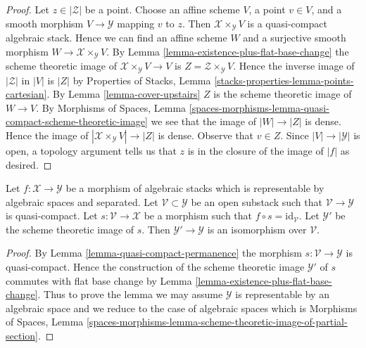 \begin{proof}
Let $z \in |\mathcal{Z}|$ be a point.
Choose an affine scheme $V$, a point $v \in V$, and a smooth morphism
$V \to \mathcal{Y}$ mapping $v$ to $z$.
Then $\mathcal{X} \times_\mathcal{Y} V$ is a quasi-compact algebraic stack.
Hence we can find an affine scheme $W$ and a surjective smooth
morphism $W \to \mathcal{X} \times_\mathcal{Y} V$.
By Lemma \ref{lemma-existence-plus-flat-base-change}
the scheme theoretic image of
$\mathcal{X} \times_\mathcal{Y} V \to V$ is
$Z = \mathcal{Z} \times_\mathcal{Y} V$.
Hence the inverse image of $|\mathcal{Z}|$ in $|V|$ is $|Z|$ by
Properties of Stacks, Lemma \ref{stacks-properties-lemma-points-cartesian}.
By Lemma \ref{lemma-cover-upstairs} $Z$ is
the scheme theoretic image of $W \to V$.
By Morphisms of Spaces, Lemma
\ref{spaces-morphisms-lemma-quasi-compact-scheme-theoretic-image}
we see that the image of $|W| \to |Z|$ is dense.
Hence the image of $|\mathcal{X} \times_\mathcal{Y} V| \to |Z|$
is dense. Observe that $v \in Z$.
Since $|V| \to |\mathcal{Y}|$ is open, a topology argument
tells us that $z$ is in the closure of the image of $|f|$ as desired.
\end{proof}

\begin{lemma}
\label{lemma-scheme-theoretic-image-of-partial-section}
Let $f : \mathcal{X} \to \mathcal{Y}$ be a morphism of algebraic stacks
which is representable by algebraic spaces and separated.
Let $\mathcal{V} \subset \mathcal{Y}$ be an open substack such that
$\mathcal{V} \to \mathcal{Y}$ is quasi-compact.
Let $s : \mathcal{V} \to \mathcal{X}$ be a morphism such that
$f \circ s = \text{id}_\mathcal{V}$.
Let $\mathcal{Y}'$ be the scheme theoretic image of $s$.
Then $\mathcal{Y}' \to \mathcal{Y}$ is an isomorphism over $\mathcal{V}$.
\end{lemma}

\begin{proof}
By Lemma \ref{lemma-quasi-compact-permanence}
the morphism $s : \mathcal{V} \to \mathcal{Y}$ is quasi-compact.
Hence the construction of the scheme theoretic image $\mathcal{Y}'$
of $s$ commutes with flat base change by
Lemma \ref{lemma-existence-plus-flat-base-change}.
Thus to prove the lemma
we may assume $\mathcal{Y}$ is representable by an algebraic space
and we reduce to the case of algebraic spaces which is
Morphisms of Spaces, Lemma
\ref{spaces-morphisms-lemma-scheme-theoretic-image-of-partial-section}.
\end{proof}









